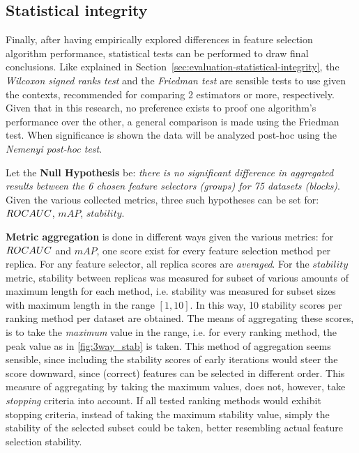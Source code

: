 \documentclass{article}
\begin{document}
\subsection{Statistical integrity}
Finally, after having empirically explored differences in feature selection algorithm performance, statistical tests can be performed to draw final conclusions. Like explained in Section~\ref{sec:evaluation-statistical-integrity}, the \textit{Wilcoxon signed ranks test} and the \textit{Friedman test} are sensible tests to use given the contexts, recommended for comparing 2 estimators or more, respectively. Given that in this research, no preference exists to proof one algorithm's performance over the other, a general comparison is made using the Friedman test. When significance is shown the data will be analyzed post-hoc using the \textit{Nemenyi post-hoc test}.

Let the \textbf{Null Hypothesis} be: \textit{there is no significant difference in aggregated results between the 6 chosen feature selectors (groups) for 75 datasets (blocks)}. Given the various collected metrics, three such hypotheses can be set for: $ROC\-AUC$, $mAP$, $stability$.

\textbf{Metric aggregation} is done in different ways given the various metrics: for $ROC\-AUC$ and $mAP$, one score exist for every feature selection method per replica. For any feature selector, all replica scores are \textit{averaged}. For the $stability$ metric, stability between replicas was measured for subset of various amounts of maximum length for each method, i.e. stability was measured for subset sizes with maximum length in the range $[1, 10]$. In this way, 10 stability scores per ranking method per dataset are obtained. The means of aggregating these scores, is to take the \textit{maximum} value in the range, i.e. for every ranking method, the peak value as in \autoref{fig:3way_stab} is taken. This method of aggregation seems sensible, since including the stability scores of early iterations would steer the score downward, since (correct) features can be selected in different order. This measure of aggregating by taking the maximum values, does not, however, take \textit{stopping} criteria into account. If all tested ranking methods would exhibit stopping criteria, instead of taking the maximum stability value, simply the stability of the selected subset could be taken, better resembling actual feature selection stability.

\end{document}
